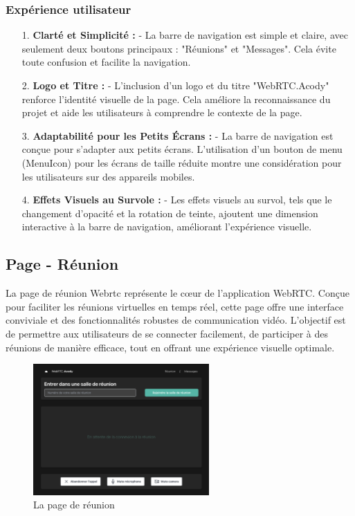 \documentclass[12pt, a4paper, oneside]{thesis}
\begin{document}
\subsubsection{Expérience utilisateur}
\begin{enumerate}
    \item[1.] \textbf{Clarté et Simplicité :}
    - La barre de navigation est simple et claire, avec seulement deux boutons principaux : "Réunions" et "Messages". Cela évite toute confusion et facilite la navigation.

    \item[2.] \textbf{Logo et Titre :}
    - L'inclusion d'un logo et du titre "WebRTC.Acody" renforce l'identité visuelle de la page. Cela améliore la reconnaissance du projet et aide les utilisateurs à comprendre le contexte de la page.
  
    \item[3.] \textbf{Adaptabilité pour les Petits Écrans :}
    - La barre de navigation est conçue pour s'adapter aux petits écrans. L'utilisation d'un bouton de menu (MenuIcon) pour les écrans de taille réduite montre une considération pour les utilisateurs sur des appareils mobiles.

    \item[4.] \textbf{Effets Visuels au Survole :}
    - Les effets visuels au survol, tels que le changement d'opacité et la rotation de teinte, ajoutent une dimension interactive à la barre de navigation, améliorant l'expérience visuelle.

\end{enumerate}
\newpage
\subsection{Page - Réunion}

La page de réunion Webrtc représente le cœur de l'application WebRTC. Conçue pour faciliter les réunions virtuelles en temps réel, cette page offre une interface conviviale et des fonctionnalités robustes de communication vidéo. L'objectif est de permettre aux utilisateurs de se connecter facilement, de participer à des réunions de manière efficace, tout en offrant une expérience visuelle optimale. 

\begin{figure}[h]
  \centering
  \includegraphics[width=0.6\textwidth]{images/ReunionPres.png}
  \caption{La page de réunion}
\end{figure}
\end{document}

